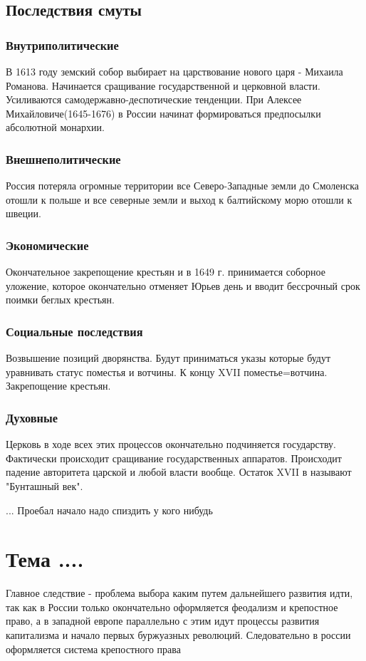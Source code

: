 \documentclass[a4paper]{article}
\begin{document}
\subsection{Последствия смуты}

\subsubsection{Внутриполитические}

В 1613 году земский собор выбирает на царствование нового царя - Михаила Романова. Начинается сращивание государственной и церковной власти. Усиливаются самодержавно-деспотические тенденции. При Алексее Михайловиче(1645-1676) в России начинат формироваться предпосылки абсолютной монархии. 

\subsubsection{Внешнеполитические}
 Россия потеряла огромные территории все Северо-Западные земли до Смоленска отошли к польше и все северные земли и выход к балтийскому морю отошли к швеции.

 \subsubsection{Экономические}
 Окончательное закрепощение крестьян и в 1649 г. принимается соборное уложение, которое окончательно отменяет Юрьев день и вводит бессрочный срок поимки беглых крестьян.

 \subsubsection{Социальные последствия}
 Возвышение позиций дворянства. Будут приниматься указы которые будут уравнивать статус поместья и вотчины. К концу XVII поместье=вотчина. 
 Закрепощение крестьян. 

 \subsubsection{Духовные}
 Церковь в ходе всех этих процессов окончательно подчиняется государству. Фактически происходит сращивание государственных аппаратов.
 Происходит падение авторитета царской и любой власти вообще. Остаток XVII в называют "Бунташный век".

... Проебал начало надо спиздить у кого нибудь

\section{Тема ....}
Главное следствие - проблема выбора каким путем дальнейшего развития идти, так как в России только окончательно оформляется феодализм и крепостное право, а в западной европе параллельно с этим идут процессы развития капитализма и начало первых буржуазных революций.
Следовательно в россии оформляется система крепостного права
\end{document}
